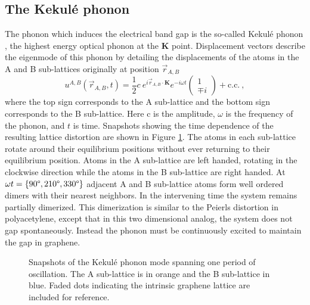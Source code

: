 \subsection{The Kekul\'e phonon}
The phonon which induces the electrical band gap is the so-called Kekul\'e phonon \cite{Hou2007}, the highest energy optical phonon at the $\bm{K}$ point.
Displacement vectors describe the eigenmode of this phonon by detailing the displacements of the atoms in the A and B sub-lattices originally at position $\vec{r}_{A,B}$
\begin{equation}
	u^{A,B}(\vec{r}_{A,B},t)=\frac{1}{2} c \ e^{i \vec{r}_{A,B} \cdot \bm{K}} e^{-i \omega t} 
		\left( \begin{array}{c}
			1 \\
			\mp i
		\end{array} \right)
	 + \text{c.c.} \label{eq:kek:displacements} \ ,
\end{equation}
where the top sign corresponds to the A sub-lattice and the bottom sign corresponds to the B sub-lattice.
Here c is the amplitude, $\omega$ is the frequency of the phonon, and $t$ is time.
Snapshots showing the time dependence of the resulting lattice distortion are shown in Figure \ref{fig:kek:snapshots}.
The atoms in each sub-lattice rotate around their equilibrium positions without ever returning to their equilibrium position.
Atoms in the A sub-lattice are left handed, rotating in the clockwise direction while the atoms in the B sub-lattice are right handed.
At $\omega t=\{90 \text{\textdegree}, 210 \text{\textdegree}, 330 \text{\textdegree} \}$ adjacent A and B sub-lattice atoms form well ordered dimers with their nearest neighbors.
In the intervening time the system remains partially dimerized.
This dimerization is similar to the Peierls distortion in polyacetylene, except that in this two dimensional analog, the system does not gap spontaneously.
Instead the phonon must be continuously excited to maintain the gap in graphene.

\begin{figure}
	\begin{center}
	
	\end{center}
	\caption[Snapshots of the Kekul\'e phonon mode]{\label{fig:kek:snapshots}
		Snapshots of the Kekul\'e phonon mode spanning one period of oscillation.
		The A sub-lattice is in orange and the B sub-lattice in blue.
		Faded dots indicating the intrinsic graphene lattice are included for reference.}
\end{figure}

